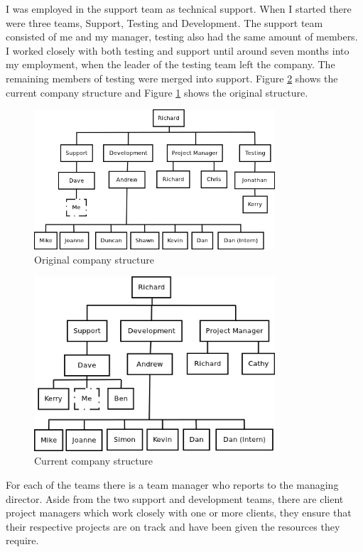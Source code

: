 \documentclass[paper=a4, fontsize=11pt]{scrartcl}	%
\begin{document}
I was employed in the support team as technical support. When I started there were three teams, Support, Testing and Development. The support team consisted of me and my manager, testing also had the same amount of members. I worked closely with both testing and support until around seven months into my employment, when the leader of the testing team left the company. The remaining members of testing were merged into support. Figure \ref{fig:current_structure} shows the current company structure and Figure \ref{fig:original_structure} shows the original structure.

\begin{figure}[htb]
\centering
\includegraphics[width=0.8\textwidth]{OriginalStructure}
\caption{Original company structure}
\label{fig:original_structure}
\end{figure}

\begin{figure}[htb]
\centering
\includegraphics[width=0.8\textwidth]{CurrentStructure}
\caption{Current company structure}
\label{fig:current_structure}
\end{figure}

For each of the teams there is a team manager who reports to the managing director.  Aside from the two support and development teams, there are client project managers which work closely with one or more clients, they ensure that their respective projects are on track and have been given the resources they require.
\end{document}
